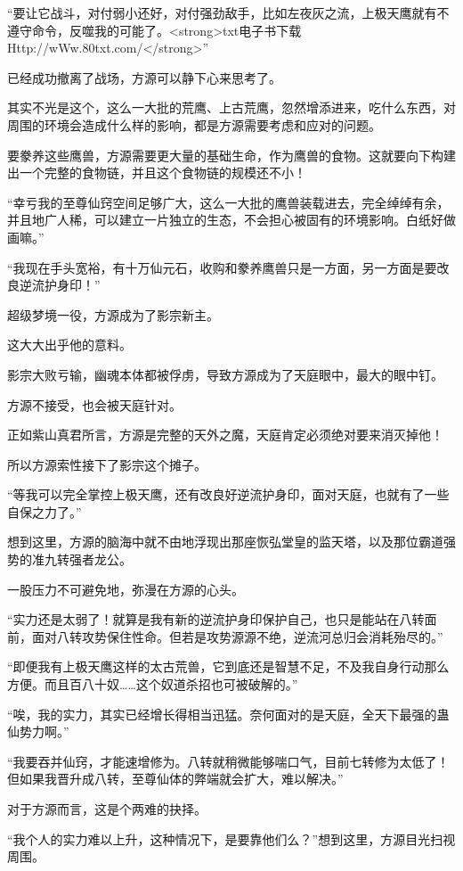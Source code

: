 \begin{this_body}
“要让它战斗，对付弱小还好，对付强劲敌手，比如左夜灰之流，上极天鹰就有不遵守命令，反噬我的可能了。<strong>txt电子书下载Http://wWw.80txt.com/</strong>”

已经成功撤离了战场，方源可以静下心来思考了。

其实不光是这个，这么一大批的荒鹰、上古荒鹰，忽然增添进来，吃什么东西，对周围的环境会造成什么样的影响，都是方源需要考虑和应对的问题。

要豢养这些鹰兽，方源需要更大量的基础生命，作为鹰兽的食物。这就要向下构建出一个完整的食物链，并且这个食物链的规模还不小！

“幸亏我的至尊仙窍空间足够广大，这么一大批的鹰兽装载进去，完全绰绰有余，并且地广人稀，可以建立一片独立的生态，不会担心被固有的环境影响。白纸好做画嘛。”

“我现在手头宽裕，有十万仙元石，收购和豢养鹰兽只是一方面，另一方面是要改良逆流护身印！”

超级梦境一役，方源成为了影宗新主。

这大大出乎他的意料。

影宗大败亏输，幽魂本体都被俘虏，导致方源成为了天庭眼中，最大的眼中钉。

方源不接受，也会被天庭针对。

正如紫山真君所言，方源是完整的天外之魔，天庭肯定必须绝对要来消灭掉他！

所以方源索性接下了影宗这个摊子。

“等我可以完全掌控上极天鹰，还有改良好逆流护身印，面对天庭，也就有了一些自保之力了。”

想到这里，方源的脑海中就不由地浮现出那座恢弘堂皇的监天塔，以及那位霸道强势的准九转强者龙公。

一股压力不可避免地，弥漫在方源的心头。

“实力还是太弱了！就算是我有新的逆流护身印保护自己，也只是能站在八转面前，面对八转攻势保住性命。但若是攻势源源不绝，逆流河总归会消耗殆尽的。”

“即便我有上极天鹰这样的太古荒兽，它到底还是智慧不足，不及我自身行动那么方便。而且百八十奴……这个奴道杀招也可被破解的。”

“唉，我的实力，其实已经增长得相当迅猛。奈何面对的是天庭，全天下最强的蛊仙势力啊。”

“我要吞并仙窍，才能速增修为。八转就稍微能够喘口气，目前七转修为太低了！但如果我晋升成八转，至尊仙体的弊端就会扩大，难以解决。”

对于方源而言，这是个两难的抉择。

“我个人的实力难以上升，这种情况下，是要靠他们么？”想到这里，方源目光扫视周围。


\end{this_body}
